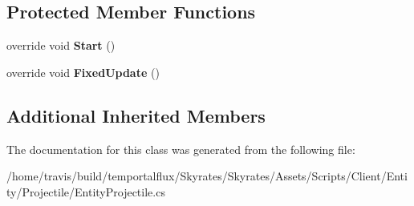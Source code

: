 \subsection*{Protected Member Functions}
\begin{DoxyCompactItemize}
\item 
\hypertarget{class_entity_projectile_aeaa635535fb8be7c8fdc4eb10c6cf0cc}{override void {\bfseries Start} ()}\label{class_entity_projectile_aeaa635535fb8be7c8fdc4eb10c6cf0cc}

\item 
\hypertarget{class_entity_projectile_a7d20878e1e4491c79d3c4fba052783e3}{override void {\bfseries Fixed\-Update} ()}\label{class_entity_projectile_a7d20878e1e4491c79d3c4fba052783e3}

\end{DoxyCompactItemize}
\subsection*{Additional Inherited Members}


The documentation for this class was generated from the following file\-:\begin{DoxyCompactItemize}
\item 
/home/travis/build/temportalflux/\-Skyrates/\-Skyrates/\-Assets/\-Scripts/\-Client/\-Entity/\-Projectile/Entity\-Projectile.\-cs\end{DoxyCompactItemize}
